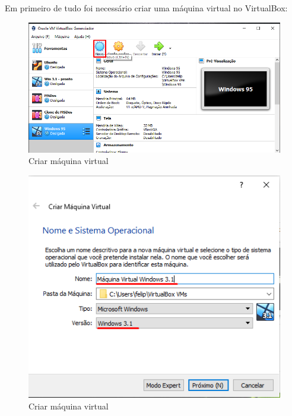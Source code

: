 \documentclass{report}
\begin{document}
Em primeiro de tudo foi necessário criar uma máquina virtual no VirtualBox:
\begin{figure}[h]
\centering
\includegraphics[width=\textwidth]{Screenshot_1.png}
\caption{Criar máquina virtual}
\label{fig:1}
\end{figure}

\begin{figure}
\centering
\includegraphics[width=\textwidth]{Screenshot_2.png}
\caption{Criar máquina virtual}
\label{fig:2}
\end{figure}
\end{document}
